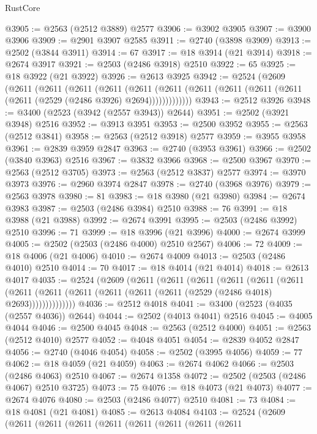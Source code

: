 \begin{lexlean}{RustCore}
\begin{coremodule}
@3905 := @2563 (@2512 @3889) @2577
@3906 := @3902 @3905
@3907 := @3900 @3906
@3909 := @2901 @3907 @2585
@3911 := @2740 (@3898 @3909)
@3913 := @2502 (@3844 @3911)
@3914 := 67
@3917 := @18 @3914 (@21 @3914)
@3918 := @2674 @3917
@3921 := @2503 (@2486 @3918) @2510
@3922 := 65
@3925 := @18 @3922 (@21 @3922)
@3926 := @2613 @3925
@3942 := @2524
    (@2609
      (@2611
        (@2611
          (@2611
            (@2611
              (@2611
                (@2611 (@2611 (@2611 (@2611 (@2611 (@2611 (@2529 (@2486 @3926) @2694)))))))))))))
@3943 := @2512 @3926
@3948 := @3400 (@2523 (@3942 (@2557 @3943)) @2644)
@3951 := @2502 (@3921 @3948) @2516
@3952 := @3913 @3951
@3953 := @2500 @3952
@3955 := @2563 (@2512 @3841)
@3958 := @2563 (@2512 @3918) @2577
@3959 := @3955 @3958
@3961 := @2839 @3959 @2847
@3963 := @2740 (@3953 @3961)
@3966 := @2502 (@3840 @3963) @2516
@3967 := @3832 @3966
@3968 := @2500 @3967
@3970 := @2563 (@2512 @3705)
@3973 := @2563 (@2512 @3837) @2577
@3974 := @3970 @3973
@3976 := @2960 @3974 @2847
@3978 := @2740 (@3968 @3976)
@3979 := @2563 @3978
@3980 := 81
@3983 := @18 @3980 (@21 @3980)
@3984 := @2674 @3983
@3987 := @2503 (@2486 @3984) @2510
@3988 := 76
@3991 := @18 @3988 (@21 @3988)
@3992 := @2674 @3991
@3995 := @2503 (@2486 @3992) @2510
@3996 := 71
@3999 := @18 @3996 (@21 @3996)
@4000 := @2674 @3999
@4005 := @2502 (@2503 (@2486 @4000) @2510 @2567)
@4006 := 72
@4009 := @18 @4006 (@21 @4006)
@4010 := @2674 @4009
@4013 := @2503 (@2486 @4010) @2510
@4014 := 70
@4017 := @18 @4014 (@21 @4014)
@4018 := @2613 @4017
@4035 := @2524
    (@2609
      (@2611
        (@2611
          (@2611
            (@2611
              (@2611
                (@2611
                  (@2611 (@2611 (@2611 (@2611 (@2611 (@2611 (@2529 (@2486 @4018) @2693))))))))))))))
@4036 := @2512 @4018
@4041 := @3400 (@2523 (@4035 (@2557 @4036)) @2644)
@4044 := @2502 (@4013 @4041) @2516
@4045 := @4005 @4044
@4046 := @2500 @4045
@4048 := @2563 (@2512 @4000)
@4051 := @2563 (@2512 @4010) @2577
@4052 := @4048 @4051
@4054 := @2839 @4052 @2847
@4056 := @2740 (@4046 @4054)
@4058 := @2502 (@3995 @4056)
@4059 := 77
@4062 := @18 @4059 (@21 @4059)
@4063 := @2674 @4062
@4066 := @2503 (@2486 @4063) @2510
@4067 := @2674 @1358
@4072 := @2502 (@2503 (@2486 @4067) @2510 @3725)
@4073 := 75
@4076 := @18 @4073 (@21 @4073)
@4077 := @2674 @4076
@4080 := @2503 (@2486 @4077) @2510
@4081 := 73
@4084 := @18 @4081 (@21 @4081)
@4085 := @2613 @4084
@4103 := @2524
    (@2609
      (@2611
        (@2611
          (@2611
            (@2611
              (@2611
                (@2611
                  (@2611
                    (@2611

\end{coremodule}
\end{lexlean}
